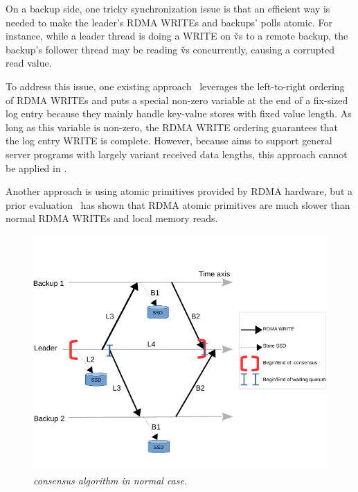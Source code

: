 % 


On a backup side, one tricky synchronization issue is that an efficient way is 
needed to make the leader's RDMA WRITEs and backups' polls atomic. For instance, 
while a leader thread is doing a WRITE on \v{vs} to a remote backup, the
backup's follower thread may be reading \v{vs} concurrently, causing a 
corrupted read value.

To address this issue, one existing approach~\cite{farm:nsdi14,herd:sigcomm14} 
leverages the left-to-right ordering of RDMA WRITEs and puts a special 
non-zero variable at the end of a fix-sized log entry because they mainly 
handle key-value stores with fixed value length. As long as this variable is 
non-zero, the RDMA WRITE ordering guarantees that the log entry WRITE is 
complete. However, because \xxx aims to support general server programs with 
largely variant received data lengths, this approach cannot be applied in \xxx.

Another approach is using atomic primitives provided by RDMA hardware, 
but a prior evaluation~\cite{drtm:sosp15} has shown that RDMA atomic 
primitives are much slower than normal RDMA WRITEs and local memory reads.

\begin{figure}[t]
\centering
\vspace{-0.4in}
\includegraphics[width=.48\textwidth]{figures/consensus}
\vspace{-.25in}
\caption{{\em \xxx consensus algorithm in normal case.}} \label{fig:consensus}
\vspace{-.2in}
\end{figure}

